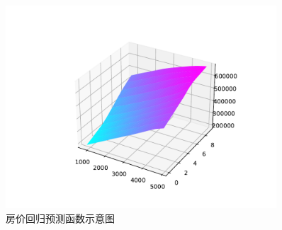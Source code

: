 \begin{figure}[H]
    \centering
    \includegraphics[width=0.9\textwidth]{figures/regress.pdf}
    \caption{房价回归预测函数示意图}
\end{figure}